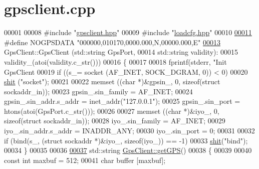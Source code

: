 \hypertarget{gpsclient_8cpp_source}{}\section{gpsclient.\+cpp}
\label{gpsclient_8cpp_source}

\begin{DoxyCode}
00001 
00008 \textcolor{preprocessor}{#include "\hyperlink{gpsclient_8hpp}{gpsclient.hpp}"}
00009 \textcolor{preprocessor}{#include "\hyperlink{loadcfg_8hpp}{loadcfg.hpp}"}
00010 
\hyperlink{gpsclient_8cpp_a63444c88dbff8d58074abff3724261e8}{00011} \textcolor{preprocessor}{#define NOGPSDATA  "000000,010170,0000.000,N,00000.000,E" }
\hyperlink{classGpsClient_aabd8adfb2fd64e34abb77cdae5d60cb5}{00013} \textcolor{preprocessor}{GpsClient::GpsClient (std::string GpsPort, }
00014                       std::string validity):
00015   validity\_(atoi(validity.c\_str()))
00016 \{
00017 
00018   fprintf(stderr, \textcolor{stringliteral}{"Init GpsClient %
00019   \textcolor{keywordflow}{if} ((s\_= socket (AF\_INET, SOCK\_DGRAM, 0)) < 0)
00020     \hyperlink{loadcfg_8cpp_a91f772c379dc1d6c6088d077aa722574}{shit} (\textcolor{stringliteral}{"socket"});
00021   
00022   memset ((\textcolor{keywordtype}{char} *)&gpsin\_, 0, \textcolor{keyword}{sizeof}(\textcolor{keyword}{struct} sockaddr\_in));
00023   gpsin\_.sin\_family      = AF\_INET;
00024   gpsin\_.sin\_addr.s\_addr = inet\_addr(\textcolor{stringliteral}{"127.0.0.1"});
00025   gpsin\_.sin\_port        = htons(atoi(GpsPort.c\_str()));
00026   
00027   memset ((\textcolor{keywordtype}{char} *)&iyo\_, 0, \textcolor{keyword}{sizeof}(\textcolor{keyword}{struct} sockaddr\_in));
00028   iyo\_.sin\_family      = AF\_INET;
00029   iyo\_.sin\_addr.s\_addr = INADDR\_ANY;
00030   iyo\_.sin\_port        = 0;
00031   
00032   \textcolor{keywordflow}{if} (bind(s\_, (\textcolor{keyword}{struct} sockaddr *)&iyo\_, \textcolor{keyword}{sizeof}(iyo\_)) == -1)
00033     \hyperlink{loadcfg_8cpp_a91f772c379dc1d6c6088d077aa722574}{shit}(\textcolor{stringliteral}{"bind"});
00034 \}
00035 
00036 
\hyperlink{classGpsClient_ace715e2b156d90e8d0b6cd1a91da4807}{00037} std::string \hyperlink{classGpsClient_ace715e2b156d90e8d0b6cd1a91da4807}{GpsClient::getGPS}()
00038 \{
00039   
00040   \textcolor{keyword}{const} \textcolor{keywordtype}{int} maxbuf = 512;
00041   \textcolor{keywordtype}{char} buffer [maxbuf];
}
\end{DoxyCode}
